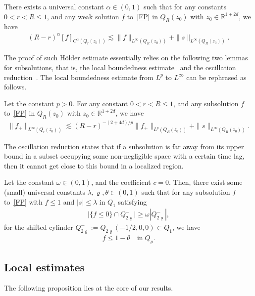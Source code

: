 \documentclass[AHL,Unicode,longabstracts,published]{cedram}
\newcommand*\R {\mathbb{R}}
\begin{document}
\begin{lemm}\label{interior}
There exists a universal constant $\alpha\in(0,1)$ such that for any constants $0<r<R\le1$, and any weak solution $f$ to~\eqref{FP} in $Q_R(z_0)$ with $z_0\in\R^{1+2d}$, we have
\begin{align*}
(R-r)^\alpha[f]_{C^\alpha(Q_r(z_0))}
\lesssim \|f\|_{L^\infty(Q_R(z_0))} +\|s\|_{L^\infty(Q_R(z_0))}.
\end{align*}
\end{lemm}

The proof of such H\"older estimate essentially relies on the following two lemmas for subsolutions, that is, the local boundedness estimate~\cite[Theorem~3.1]{GIMV} and the oscillation reduction~\cite[Lemma~4.5]{GIMV}. The local boundedness estimate from $L^p$ to $L^\infty$ can be rephrased as follows.
\begin{lemm}\label{bdd}
Let the constant $p>0$. For any constant $0<r<R\le1$, and any subsolution $f$ to~\eqref{FP} in $Q_R(z_0)$ with $z_0\in\R^{1+2d}$, we have
\begin{align*}
\|f_+\|_{L^\infty(Q_r(z_0))}
\lesssim (R-r)^{-(2+4d)/p}\|f_+\|_{L^p(Q_R(z_0))} + \|s\|_{L^\infty(Q_R(z_0))}.
\end{align*}
\end{lemm}

The oscillation reduction states that if a subsolution is far away from its upper bound in a subset occupying some non-negligible space with a certain time lag, then it cannot get close to this bound in a localized region.

\begin{lemm}\label{measure}
Let the constant $\omega\in(0,1)$, and the coefficient $c=0$. Then, there exist some (small) universal constants $\lambda,\varrho,\theta\in(0,1)$ such that for any subsolution $f$ to~\eqref{FP} with $f\le1$ and $|s|\le\lambda$ in $Q_1$ satisfying
\begin{align*}
\big|\{f\le 0\}\cap Q_{2\varrho}^-\big|\ge \omega
\left| Q_{2\varrho}^-\right|,
\end{align*}
for the shifted cylinder $Q_{2\varrho}^-:=Q_{2\varrho}\left(-1/2,0,0\right)\subset Q_1$, we have
\begin{align*}
f\le 1-\theta \quad\text{in}\; Q_\varrho.
\end{align*}
\end{lemm}

\subsection{Local estimates}\label{inflowproof}
The following proposition lies at the core of our results.
\end{document}

